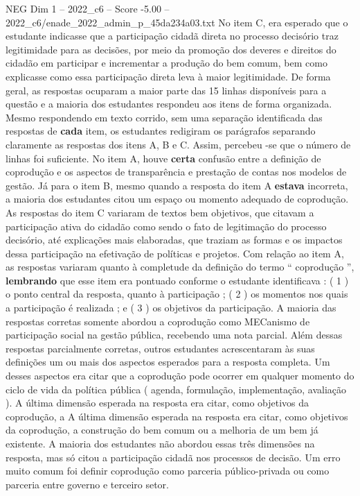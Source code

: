 \begin{textsample}{NEG Dim 1 – 2022\_c6 – Score -5.00 – 2022\_c6/enade\_2022\_admin\_p\_45da234a03.txt}
No item C, era esperado que o estudante indicasse que a participação cidadã direta no processo decisório traz legitimidade para as decisões, por meio da promoção dos deveres e direitos do cidadão em participar e incrementar a produção do bem comum, bem como explicasse como essa participação direta leva à maior legitimidade.
De forma geral, as respostas ocuparam a maior parte das 15 linhas disponíveis para a questão e a maioria dos estudantes respondeu aos itens de forma organizada.
Mesmo respondendo em texto corrido, sem uma separação identificada das respostas de \textbf{cada} item, os estudantes redigiram os parágrafos separando claramente as respostas dos itens A, B e C.
Assim, percebeu -se que o número de linhas foi suficiente.
No item A, houve \textbf{certa} confusão entre a definição de coprodução e os aspectos de transparência e prestação de contas nos modelos de gestão.
Já para o item B, mesmo quando a resposta do item A \textbf{estava} incorreta, a maioria dos estudantes citou um espaço ou momento adequado de coprodução.
As respostas do item C variaram de textos bem objetivos, que citavam a participação ativa do cidadão como sendo o fato de legitimação do processo decisório, até explicações mais elaboradas, que traziam as formas e os impactos dessa participação na efetivação de políticas e projetos.
Com relação ao item A, as respostas variaram quanto à completude da definição do termo “ coprodução ”, \textbf{lembrando} que esse item era pontuado conforme o estudante identificava : ( 1 ) o ponto central da resposta, quanto à participação ; ( 2 ) os momentos nos quais a participação é realizada ; e ( 3 ) os objetivos da participação.
A maioria das respostas corretas somente abordou a coprodução como MECanismo de participação social na gestão pública, recebendo uma nota parcial.
Além dessas respostas parcialmente corretas, outros estudantes acrescentaram às suas definições um ou mais dos aspectos esperados para a resposta completa.
Um desses aspectos era citar que a coprodução pode ocorrer em qualquer momento do ciclo de vida da política pública ( agenda, formulação, implementação, avaliação ).
A última dimensão esperada na resposta era citar, como objetivos da coprodução, a A última dimensão esperada na resposta era citar, como objetivos da coprodução, a construção do bem comum ou a melhoria de um bem já existente.
A maioria dos estudantes não abordou essas três dimensões na resposta, mas só citou a participação cidadã nos processos de decisão.
Um erro muito comum foi definir coprodução como parceria público-privada ou como parceria entre governo e terceiro setor.

\end{textsample}
